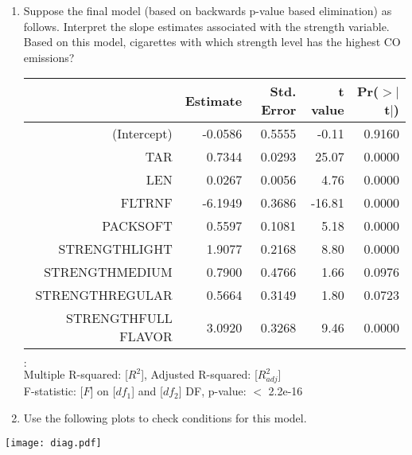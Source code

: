 \documentclass[11pt]{article}
\begin{document}
\begin{enumerate}
\item Suppose the final model (based on backwards p-value based elimination) as follows. Interpret the slope estimates associated with the strength variable. Based on this model, cigarettes with which strength level has the highest CO emissions?

{\small
\begin{center}
\begin{tabular}{rrrrr}
  \hline
 & Estimate & Std. Error & t value & Pr($>$$|$t$|$) \\ 
  \hline
(Intercept) & -0.0586 & 0.5555 & -0.11 & 0.9160 \\ 
  TAR & 0.7344 & 0.0293 & 25.07 & 0.0000 \\ 
  LEN & 0.0267 & 0.0056 & 4.76 & 0.0000 \\ 
  FLTRNF & -6.1949 & 0.3686 & -16.81 & 0.0000 \\ 
  PACKSOFT & 0.5597 & 0.1081 & 5.18 & 0.0000 \\ 
  STRENGTHLIGHT & 1.9077 & 0.2168 & 8.80 & 0.0000 \\ 
  STRENGTHMEDIUM & 0.7900 & 0.4766 & 1.66 & 0.0976 \\ 
  STRENGTHREGULAR & 0.5664 & 0.3149 & 1.80 & 0.0723 \\ 
  STRENGTHFULL FLAVOR & 3.0920 & 0.3268 & 9.46 & 0.0000 \\ 
   \hline
\end{tabular}
$:$ \\
Multiple R-squared:  \textcolor{custom_blue}{[$R^2$]},	Adjusted R-squared:  \textcolor{custom_blue}{[$R^2_{adj}$]} \\
F-statistic: \textcolor{custom_blue}{[$F$]} on \textcolor{custom_blue}{[$df_1$]} and \textcolor{custom_blue}{[$df_2$]} DF,  p-value: $<$ 2.2e-16
\end{center}
}

\item Use the following plots to check conditions for this model.

\end{enumerate}

\begin{center}
\texttt{[image: diag.pdf]}
\end{center}
\end{document}
